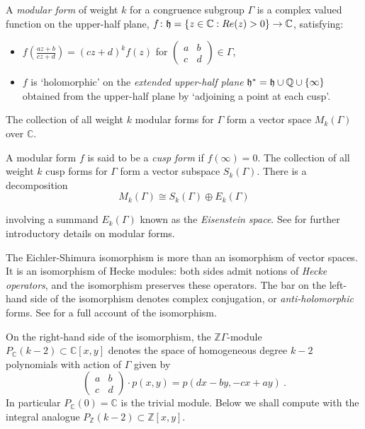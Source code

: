 \documentclass[a4paper,11pt]{report}
\begin{document}
{{A \emph{modular form} of weight $k$ for a congruence subgroup $\Gamma$ is a complex valued function on the upper-half plane, $f\colon {\frak{h}}=\{z\in \mathbb C : Re(z)>0\} \rightarrow \mathbb C$, satisfying: 
\begin{itemize}
\item  $\displaystyle f(\frac{az+b}{cz+d}) = (cz+d)^k f(z)$ for $\left(\begin{array}{ll}a&b\\ c &d \end{array}\right) \in \Gamma$, 
\item  $f$ is `holomorphic' on the \emph{extended upper-half plane} $\frak{h}^\ast = \frak{h} \cup \mathbb Q \cup \{\infty\}$ obtained from the upper-half plane by `adjoining a point at each cusp'. 
\end{itemize}
 The collection of all weight $k$ modular forms for $\Gamma$ form a vector space $M_k(\Gamma)$ over $\mathbb C$. 

A modular form $f$ is said to be a \emph{cusp form} if $f(\infty)=0$. The collection of all weight $k$ cusp forms for $\Gamma$ form a vector subspace $S_k(\Gamma)$. There is a decomposition 
\[M_k(\Gamma) \cong S_k(\Gamma) \oplus E_k(\Gamma)\]
 

 involving a summand $E_k(\Gamma)$ known as the \emph{Eisenstein space}. See \cite{stein} for further introductory details on modular forms. 

The Eichler-Shimura isomorphism is more than an isomorphism of vector spaces.
It is an isomorphism of Hecke modules: both sides admit notions of \emph{Hecke operators}, and the isomorphism preserves these operators. The bar on the left-hand side
of the isomorphism denotes complex conjugation, or \emph{anti-holomorphic} forms. See \cite{wieser} for a full account of the isomorphism. 



 On the right-hand side of the isomorphism, the $\mathbb Z\Gamma$-module $P_{\mathbb C}(k-2)\subset \mathbb C[x,y]$ denotes the space of homogeneous degree $k-2$ polynomials with action of $\Gamma$ given by 
\[\left(\begin{array}{ll}a&b\\ c &d \end{array}\right)\cdot p(x,y) =
p(dx-by,-cx+ay)\ .\]
 In particular $P_{\mathbb C}(0)=\mathbb C$ is the trivial module. Below we shall compute with the integral analogue $P_{\mathbb Z}(k-2) \subset \mathbb Z[x,y]$. 



}}
\end{document}
